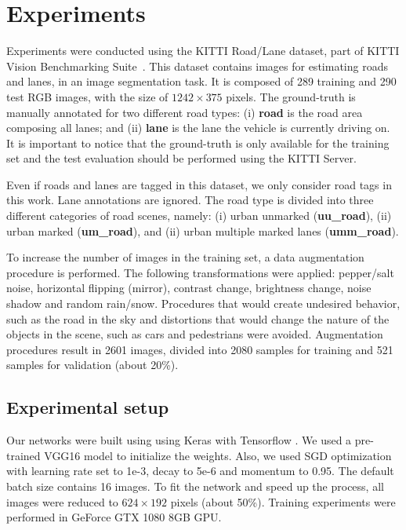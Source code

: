 \section{Experiments}
\label{sec:experiments}

Experiments were conducted using the KITTI Road/Lane dataset, part of KITTI Vision Benchmarking Suite~\cite{KITTI}. This dataset  contains  images for estimating roads and lanes, in an image segmentation task. It is composed of 289 training and 290 test RGB images, with the size of $1242 \times 375$ pixels. The ground-truth is manually annotated for two different road types: (i) \textbf{road} is the road area composing all lanes; and (ii) \textbf{lane} is the lane the vehicle is currently driving on. It is important to notice that the ground-truth is only available for the training set and the test evaluation should be performed using the KITTI Server.


Even if roads and lanes are tagged in this dataset, 
we only consider road tags in this work. Lane annotations are ignored. The road type is divided into three different categories of road scenes, namely: (i) urban unmarked (\textbf{uu\_road}), (ii) urban marked (\textbf{um\_road}), and (ii) urban multiple marked lanes (\textbf{umm\_road}).  


To increase the number of images in the training set, a data augmentation procedure is performed. The following transformations were applied: pepper/salt noise, horizontal flipping (mirror), contrast change, brightness change, noise shadow and random rain/snow. Procedures that would create undesired behavior, such as the road in the sky and distortions that would change the nature of the objects in the scene, such as cars and pedestrians were avoided. Augmentation procedures result in 2601 images, divided into 2080 samples for training and 521 samples for validation (about 20\%). 


\subsection{Experimental setup}
   
Our networks were built using using Keras \cite{chollet2015keras} with Tensorflow \cite{tensorflow2015-whitepaper}. We used a pre-trained VGG16 model to initialize the weights. Also, we used SGD optimization with learning rate set to 1e-3, decay to 5e-6 and momentum to 0.95. The default batch size contains 16 images. To fit the network and speed up the process, all images were reduced to $624 \times 192$ pixels (about 50\%). Training experiments were performed in GeForce GTX 1080 8GB GPU.


